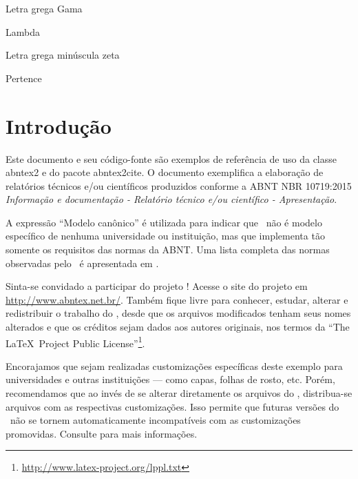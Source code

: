 \documentclass[
	12pt,				%
	oneside,            %
	a4paper,			%
	english,			%
	french,				%
	spanish,			%
	brazil,				%
	]{abntex2}
\begin{document}
\begin{simbolos}
  \item[$ \Gamma $] Letra grega Gama
  \item[$ \Lambda $] Lambda
  \item[$ \zeta $] Letra grega minúscula zeta
  \item[$ \in $] Pertence
\end{simbolos}

\tableofcontents*
\cleardoublepage


\textual

\chapter*[Introdução]{Introdução}

Este documento e seu código-fonte são exemplos de referência de uso da classe
\textsf{abntex2} e do pacote \textsf{abntex2cite}. O documento 
exemplifica a elaboração de relatórios técnicos e/ou científicos produzidos
conforme a ABNT NBR 10719:2015 \emph{Informação e documentação - Relatório
técnico e/ou científico - Apresentação}.

A expressão ``Modelo canônico'' é utilizada para indicar que \abnTeX\ não é
modelo específico de nenhuma universidade ou instituição, mas que implementa tão
somente os requisitos das normas da ABNT. Uma lista completa das normas
observadas pelo \abnTeX\ é apresentada em .

Sinta-se convidado a participar do projeto \abnTeX! Acesse o site do projeto em
\url{http://www.abntex.net.br/}. Também fique livre para conhecer,
estudar, alterar e redistribuir o trabalho do \abnTeX, desde que os arquivos
modificados tenham seus nomes alterados e que os créditos sejam dados aos
autores originais, nos termos da ``The \LaTeX\ Project Public
License''\footnote{\url{http://www.latex-project.org/lppl.txt}}.

Encorajamos que sejam realizadas customizações específicas deste exemplo para
universidades e outras instituições --- como capas, folhas de rosto, etc.
Porém, recomendamos que ao invés de se alterar diretamente os arquivos do
\abnTeX, distribua-se arquivos com as respectivas customizações.
Isso permite que futuras versões do \abnTeX~não se tornem automaticamente
incompatíveis com as customizações promovidas. Consulte
 para mais informações.
\end{document}
